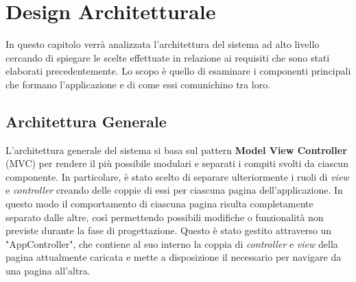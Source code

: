 

\chapter{Design Architetturale}
    In questo capitolo verrà analizzata l'architettura del sistema ad alto livello cercando di spiegare le scelte effettuate in relazione ai requisiti che sono stati elaborati precedentemente. Lo scopo è quello di esaminare i componenti principali che formano l'applicazione e di come essi comunichino tra loro.

    \section{Architettura Generale}\label{chap:architectural-design}
    L'architettura generale del sistema si basa sul pattern \textbf{Model View Controller} (MVC) per rendere il più possibile modulari e separati i compiti svolti da ciascun componente. In particolare, è stato scelto di separare ulteriormente i ruoli di \textit{view} e \textit{controller} creando delle coppie di essi per ciascuna pagina dell'applicazione. In questo modo il comportamento di ciascuna pagina risulta completamente separato dalle altre, così permettendo possibili modifiche o funzionalità non previste durante la fase di progettazione. Questo è stato gestito attraverso un "AppController", che contiene al suo interno la coppia di \textit{controller} e \textit{view} della pagina attualmente caricata e mette a disposizione il necessario per navigare da una pagina all'altra.
    
